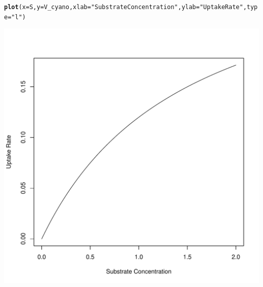\documentclass{tufte-handout}\usepackage[]{graphicx}\usepackage[]{xcolor}
\makeatletter
\def\maxwidth{ %
  \ifdim\Gin@nat@width>\linewidth
    \linewidth
  \else
    \Gin@nat@width
  \fi
}
\newcommand{\hlstr}[1]{\textcolor[rgb]{0.192,0.494,0.8}{#1}}%
\newcommand{\hlstd}[1]{\textcolor[rgb]{0.345,0.345,0.345}{#1}}%
\newcommand{\hlkwc}[1]{\textcolor[rgb]{0.333,0.667,0.333}{#1}}%
\newcommand{\hlkwd}[1]{\textcolor[rgb]{0.737,0.353,0.396}{\textbf{#1}}}%
\newenvironment{kframe}{%
 \def\at@end@of@kframe{}%
 \ifinner\ifhmode%
  \def\at@end@of@kframe{\end{minipage}}%
  \begin{minipage}{\columnwidth}%
 \fi\fi%
 \def\FrameCommand##1{\hskip\@totalleftmargin \hskip-\fboxsep
 \colorbox{shadecolor}{##1}\hskip-\fboxsep
     \hskip-\linewidth \hskip-\@totalleftmargin \hskip\columnwidth}%
 \MakeFramed {\advance\hsize-\width
   \@totalleftmargin\z@ \linewidth\hsize
   \@setminipage}}%
 {\par\unskip\endMakeFramed%
 \at@end@of@kframe}
\newenvironment{knitrout}{}{} %
\makeatother
\begin{document}
\begin{knitrout}
\color{fgcolor}\begin{kframe}
\begin{alltt}
\hlkwd{plot}\hlstd{(}\hlkwc{x}\hlstd{=S,} \hlkwc{y}\hlstd{=V_cyano,} \hlkwc{xlab}\hlstd{=}\hlstr{"Substrate Concentration"}\hlstd{,} \hlkwc{ylab}\hlstd{=}\hlstr{"Uptake Rate"}\hlstd{,} \hlkwc{type}\hlstd{=}\hlstr{"l"}\hlstd{)}
\end{alltt}
\end{kframe}
\includegraphics[width=\maxwidth]{figure/unnamed-chunk-60-1} 
\end{knitrout}
\end{document}
